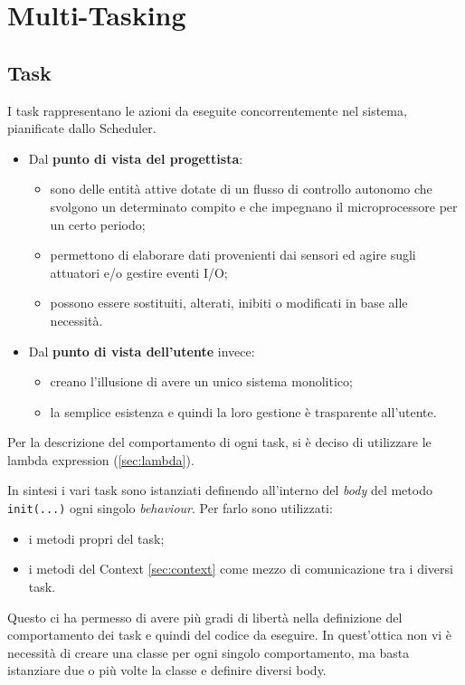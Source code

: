 \chapter{Multi-Tasking}

\section{Task}
I task rappresentano le azioni da eseguite concorrentemente nel sistema, pianificate dallo Scheduler. 

\begin{itemize}
	\item Dal \textbf{punto di vista del progettista}:
	\begin{itemize}
		\item sono delle entità attive dotate di un flusso di controllo autonomo che svolgono un determinato compito e che impegnano il microprocessore per un certo periodo;
		\item permettono di elaborare dati provenienti dai sensori ed agire sugli attuatori e/o gestire eventi I/O;
		\item possono essere sostituiti, alterati, inibiti o modificati in base alle necessità.
	\end{itemize}
	\item Dal \textbf{punto di vista dell'utente} invece:
	\begin{itemize}
		\item  creano l'illusione di avere un unico sistema monolitico;
		\item  la semplice esistenza e quindi la loro gestione è trasparente all'utente.
	\end{itemize}
\end{itemize}
Per la descrizione del comportamento di ogni task, si è deciso di utilizzare le lambda expression (\ref{sec:lambda}). 

In sintesi i vari task sono istanziati definendo all'interno del \textit{body} del metodo \texttt{init(...)} ogni singolo \textit{behaviour}. Per farlo sono utilizzati: 
\begin{itemize}
	\item i metodi propri del task;
	\item i metodi del Context \ref{sec:context} come mezzo di comunicazione tra i diversi task.
\end{itemize}
Questo ci ha permesso di avere più gradi di libertà nella definizione del comportamento dei task e quindi del codice da eseguire. In quest'ottica non vi è necessità di creare una classe per ogni singolo comportamento, ma basta istanziare due o più volte la classe e definire diversi body.

